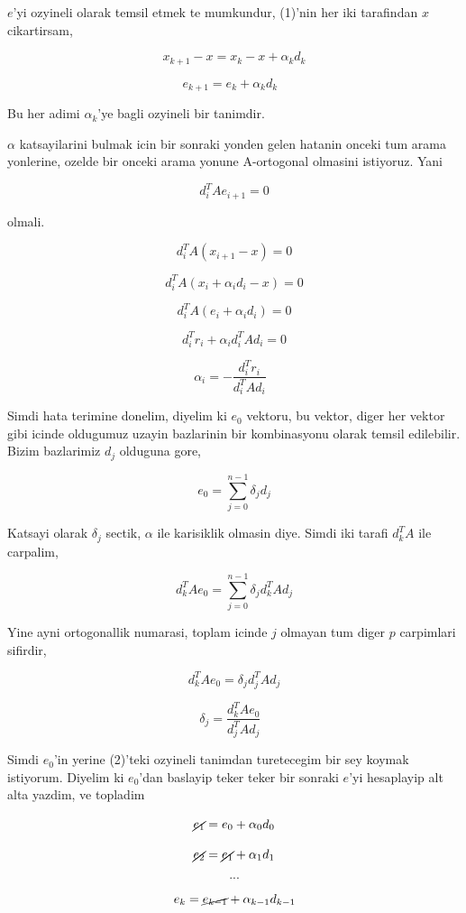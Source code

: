 \documentclass[12pt,fleqn]{article}\usepackage{../common}
\begin{document}
$e$'yi ozyineli olarak temsil etmek te mumkundur, (1)'nin her iki
tarafindan $x$ cikartirsam, 

\[ x_{k+1} - x = x_k - x + \alpha_k d_{k} \]

\[ e_{k+1} = e_k + \alpha_k d_k \ \ \ \label{2}\]

Bu her adimi $\alpha_k$'ye bagli ozyineli bir tanimdir. 

$\alpha$ katsayilarini bulmak icin bir sonraki yonden gelen hatanin onceki
tum arama yonlerine, ozelde bir onceki arama yonune A-ortogonal
olmasini istiyoruz. Yani

\[ d_i^TA e_{i+1}  = 0\]

olmali. 

\[ d_i^TA (x_{i+1}-x)  = 0\]

\[ d_i^TA (x_{i} + \alpha_i d_i -x)  = 0\]

\[ d_i^TA (e_i + \alpha_i d_i )  = 0\]

\[ d_i^Tr_i + \alpha_i d_i^TA d_i   = 0\]

\[ \alpha_i = -\frac{ d_i^Tr_i}{d_i^T A d_i} 
\ \ \ \label{6}
\]

Simdi hata terimine donelim, diyelim ki $e_0$ vektoru, bu vektor, diger
her vektor gibi icinde oldugumuz uzayin bazlarinin bir kombinasyonu olarak
temsil edilebilir. Bizim bazlarimiz $d_j$ olduguna gore, 

\[ e_0 = \sum _{ j=0}^{n-1} \delta_j d_j \]

Katsayi olarak $\delta_j$ sectik, $\alpha$ ile karisiklik olmasin
diye. Simdi iki tarafi $d_k^T A$ ile carpalim, 

\[ d_k^T A e_0 = \sum _{ j=0}^{n-1} \delta_j d_k^T A d_j \]

Yine ayni ortogonallik numarasi, toplam icinde $j$ olmayan tum diger $p$
carpimlari sifirdir, 

\[ d_k^T A e_0 =  \delta_j d_j^T A d_j \]

\[ \delta_j = \frac{ d_k^T A e_0}{ d_j^T A d_j } 
\ \ \ \label{4}
\]

Simdi $e_0$'in yerine (2)'teki ozyineli tanimdan turetecegim bir sey koymak
istiyorum. Diyelim ki $e_0$'dan baslayip teker teker bir sonraki $e$'yi
hesaplayip alt alta yazdim, ve topladim

\[ \cancel{e_{1}} = e_0 + \alpha_0 d_0\]

\[ \cancel{e_{2}} = \cancel{e_1} + \alpha_1 d_1\]

\[ ... \]

\[ e_{k} = \cancel{e_{k-1}} + \alpha_{k-1} d_{k-1}\]
\end{document}
